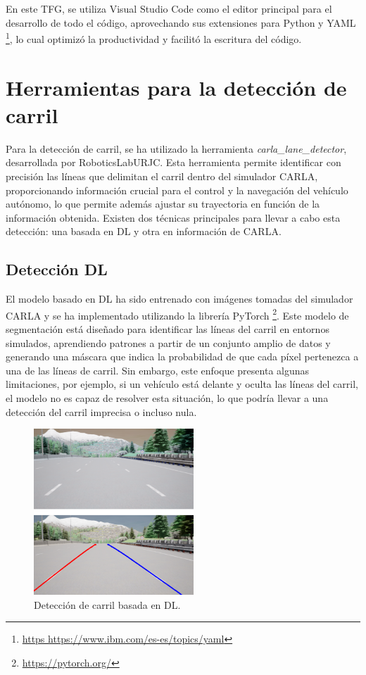 \newpage

En este \ac{TFG}, se utiliza Visual Studio Code como el editor principal para el desarrollo de todo el código, aprovechando sus extensiones para Python y YAML \footnote{\url{https https://www.ibm.com/es-es/topics/yaml}}, lo cual optimizó la productividad y facilitó la escritura del código.

\section{Herramientas para la detección de carril}
\label{sec:herramientas_carril}

Para la detección de carril, se ha utilizado la herramienta \textit{carla\_lane\_detector}, desarrollada por RoboticsLabURJC. Esta herramienta permite identificar con precisión las líneas que delimitan el carril dentro del simulador CARLA, proporcionando información crucial para el control y la navegación del vehículo autónomo, lo que permite además ajustar su trayectoria en función de la información obtenida. Existen dos técnicas principales para llevar a cabo esta detección: una basada en \ac{DL} y otra en información de CARLA.

\subsection{Detección \ac{DL}}
\label{sec:gt}

El modelo basado en \ac{DL} ha sido entrenado con imágenes tomadas del simulador CARLA y se ha implementado utilizando la librería PyTorch \footnote{\url{https://pytorch.org/}}. Este modelo de segmentación está diseñado para identificar las líneas del carril en entornos simulados, aprendiendo patrones a partir de un conjunto amplio de datos y generando una máscara que indica la probabilidad de que cada píxel pertenezca a una de las líneas de carril. Sin embargo, este enfoque presenta algunas limitaciones, por ejemplo, si un vehículo está delante y oculta las líneas del carril, el modelo no es capaz de resolver esta situación, lo que podría llevar a una detección del carril imprecisa o incluso nula.

\begin{figure}[ht]
  \begin{center}
    \includegraphics[width=6cm]{figs/Plataformas_Desarollo/carla_lane_dl.png}
  \end{center}
  \caption{Detección de carril basada en \ac{DL}.}
  \label{dl_lane}
\end{figure}

